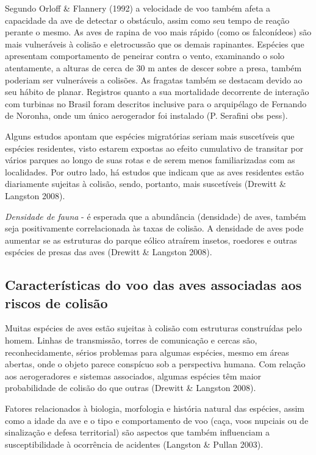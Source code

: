 \documentclass[
  oneside]{scrbook}
\begin{document}
Segundo Orloff \& Flannery (1992) a velocidade de voo também afeta a capacidade da ave de detectar o obstáculo, assim como seu tempo de reação perante o mesmo. As aves de rapina de voo mais rápido (como os falconídeos) são mais vulneráveis à colisão e eletrocussão que os demais rapinantes. Espécies que apresentam comportamento de peneirar contra o vento, examinando o solo atentamente, a alturas de cerca de 30 m antes de descer sobre a presa, também poderiam ser vulneráveis a colisões. As fragatas também se destacam devido ao seu hábito de planar. Registros quanto a sua mortalidade decorrente de interação com turbinas no Brasil foram descritos inclusive para o arquipélago de Fernando de Noronha, onde um único aerogerador foi instalado (P. Serafini obs pess).

Alguns estudos apontam que espécies migratórias seriam mais suscetíveis que espécies residentes, visto estarem expostas ao efeito cumulativo de transitar por vários parques ao longo de suas rotas e de serem menos familiarizadas com as localidades. Por outro lado, há estudos que indicam que as aves residentes estão diariamente sujeitas à colisão, sendo, portanto, mais suscetíveis (Drewitt \& Langston 2008).

\emph{Densidade de fauna} - é esperada que a abundância (densidade) de aves, também seja positivamente correlacionada às taxas de colisão. A densidade de aves pode aumentar se as estruturas do parque eólico atraírem insetos, roedores e outras espécies de presas das aves (Drewitt \& Langston 2008).

\hypertarget{caracteristicas-voo}{%
\subsection{Características do voo das aves associadas aos riscos de colisão}\label{caracteristicas-voo}}

Muitas espécies de aves estão sujeitas à colisão com estruturas construídas pelo homem. Linhas de transmissão, torres de comunicação e cercas são, reconhecidamente, sérios problemas para algumas espécies, mesmo em áreas abertas, onde o objeto parece conspícuo sob a perspectiva humana. Com relação aos aerogeradores e sistemas associados, algumas espécies têm maior probabilidade de colisão do que outras (Drewitt \& Langston 2008).

Fatores relacionados à biologia, morfologia e história natural das espécies, assim como a idade da ave e o tipo e comportamento de voo (caça, voos nupciais ou de sinalização e defesa territorial) são aspectos que também influenciam a susceptibilidade à ocorrência de acidentes (Langston \& Pullan 2003).
\end{document}
